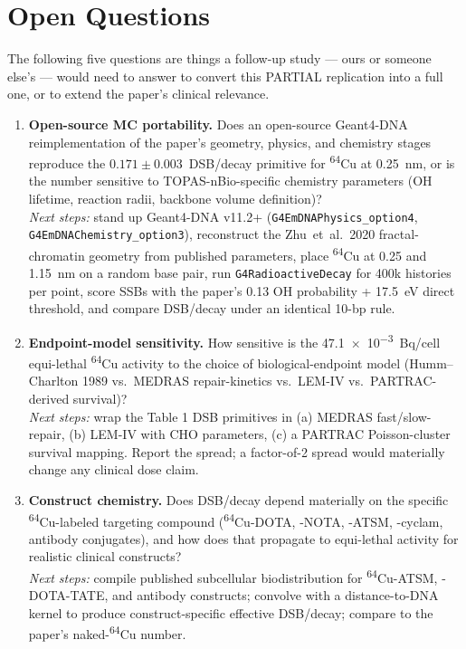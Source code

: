 \section{Open Questions}
\label{sec:open}

The following five questions are things a follow-up study --- ours or someone
else's --- would need to answer to convert this PARTIAL replication into a
full one, or to extend the paper's clinical relevance.

\begin{enumerate}

\item \textbf{Open-source MC portability.}
Does an open-source Geant4-DNA reimplementation of the paper's geometry,
physics, and chemistry stages reproduce the $0.171 \pm 0.003$~DSB/decay
primitive for \textsuperscript{64}Cu at \SI{0.25}{nm}, or is the number
sensitive to TOPAS-nBio-specific chemistry parameters (\textbullet OH
lifetime, reaction radii, backbone volume definition)?\\
\emph{Next steps:} stand up Geant4-DNA v11.2+ (\texttt{G4EmDNAPhysics\_option4},
\texttt{G4EmDNAChemistry\_option3}), reconstruct the Zhu~et~al.\ 2020
fractal-chromatin geometry from published parameters, place
\textsuperscript{64}Cu at 0.25 and 1.15~nm on a random base pair, run
\texttt{G4RadioactiveDecay} for 400k histories per point, score SSBs with the
paper's 0.13 \textbullet OH probability + 17.5~eV direct threshold, and
compare DSB/decay under an identical 10-bp rule.

\item \textbf{Endpoint-model sensitivity.}
How sensitive is the \SI{47.1e-3}{Bq/cell} equi-lethal
\textsuperscript{64}Cu activity to the choice of biological-endpoint model
(Humm--Charlton 1989 vs.\ MEDRAS repair-kinetics vs.\ LEM-IV vs.\
PARTRAC-derived survival)?\\
\emph{Next steps:} wrap the Table 1 DSB primitives in (a) MEDRAS
fast/slow-repair, (b) LEM-IV with CHO parameters, (c) a PARTRAC
Poisson-cluster survival mapping.  Report the spread; a factor-of-2 spread
would materially change any clinical dose claim.

\item \textbf{Construct chemistry.}
Does DSB/decay depend materially on the specific
\textsuperscript{64}Cu-labeled targeting compound
(\textsuperscript{64}Cu-DOTA, -NOTA, -ATSM, -cyclam, antibody conjugates),
and how does that propagate to equi-lethal activity for realistic
clinical constructs?\\
\emph{Next steps:} compile published subcellular biodistribution for
\textsuperscript{64}Cu-ATSM, -DOTA-TATE, and antibody constructs; convolve
with a distance-to-DNA kernel to produce construct-specific effective
DSB/decay; compare to the paper's naked-\textsuperscript{64}Cu number.


\end{enumerate}
